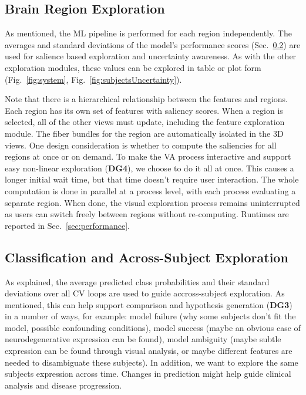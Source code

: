 

\subsection{Brain Region Exploration}
\label{sec:aggregation}

\noindent As mentioned, the ML pipeline is performed for each region independently. The averages and standard deviations of the model's performance scores (Sec.~\ref{sec:subjects}) are used for salience based exploration and uncertainty awareness. As with the other exploration modules, these values can be explored in table or plot form (Fig.~\ref{fig:system}, Fig.~\ref{fig:subjectsUncertainty}).

Note that there is a hierarchical relationship between the features and regions. Each region has its own set of features with saliency scores. When a region is selected, all of the other views must update, including the feature exploration module. The fiber bundles for the region are automatically isolated in the 3D views. One design consideration is whether to compute the saliencies for all regions at once or on demand. To make the VA process interactive and support easy non-linear exploration (\textbf{DG4}), we choose to do it all at once. This causes a longer initial wait time, but that time doesn't require user interaction. The whole computation is done in parallel at a process level, with each process evaluating a separate region. When done, the visual exploration process remains uninterrupted as users can switch freely between regions without re-computing. Runtimes are reported in Sec.~\ref{sec:performance}.



\subsection{Classification and Across-Subject Exploration}
\label{sec:subjects}

\noindent As explained, the average predicted class probabilities and their standard deviations over all CV loops are used to guide accross-subject exploration. As mentioned, this can help support comparison and hypothesis generation (\textbf{DG3}) in a number of ways, for example: model failure (why some subjects don't fit the model, possible confounding conditions), model success (maybe an obvious case of neurodegenerative expression can be found), model ambiguity (maybe subtle expression can be found through visual analysis, or maybe different features are needed to disambiguate these subjects). In addition, we want to explore the same subjects expression across time. Changes in prediction might help guide clinical analysis and disease progression. 

